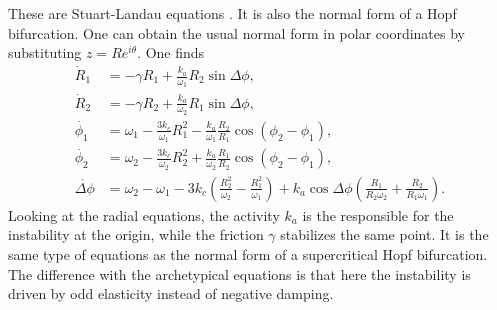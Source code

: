 \documentclass[11pt, a4paper]{article} %
\newcommand{\xd}{\dot{x}}
\newcommand{\Th}{\theta}
\begin{document}
These are Stuart-Landau equations \cite{Landau:1944ibh,Stuart_1958,Stuart_1960}. 
It is also the normal form of a Hopf bifurcation. One can obtain the usual normal form 
in polar coordinates by substituting $z=Re^{i\Th}$. One finds
\begin{align}
    \dot{R}_1 &= -\gamma R_1 + \frac{k_a}{\omega_1}R_2 \sin{\Delta\phi}, \\ %
    \dot{R}_2 &= -\gamma R_2 + \frac{k_a}{\omega_2}R_1 \sin{\Delta\phi}, \\
    \dot{\phi_1} &= \omega_1 - \frac{3k_c}{\omega_1} R_1^2 -\frac{k_a}{\omega_1}\frac{R_2}{R_1}\cos{(\phi_2-\phi_1)}, \\
    \dot{\phi_2} &= \omega_2 - \frac{3k_c}{\omega_2} R_2^2 +\frac{k_a}{\omega_2}\frac{R_1}{R_2}\cos{(\phi_2-\phi_1)}, \\
    \dot{\Delta\phi} &= \omega_2 - \omega_1 - 3k_c\left(\frac{R_2^2}{\omega_2} - \frac{R_1^2}{\omega_1}\right) 
    + k_a\cos{\Delta\phi} \left(\frac{R_1}{R_2\omega_2} + \frac{R_2}{R_1\omega_1}\right).
\end{align}
Looking at the radial equations, the activity $k_a$ is the responsible for the instability at the origin, while the friction 
$\gamma$ stabilizes the same point. It is the same type of equations as the normal form of a supercritical Hopf bifurcation.
The difference with the archetypical equations is that here the instability is driven by odd elasticity instead of negative damping. 





\end{document}
